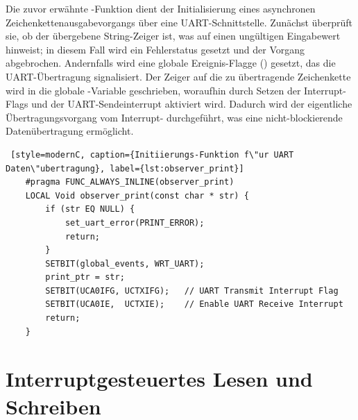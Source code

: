 \newpage
Die zuvor erw\"ahnte -Funktion dient der Initialisierung eines asynchronen Zeichenkettenausgabevorgangs \"uber eine UART-Schnittstelle. Zun\"achst \"uberpr\"uft sie, ob der \"ubergebene String-Zeiger  ist, was auf einen ung\"ultigen Eingabewert hinweist; in diesem Fall wird ein Fehlerstatus gesetzt und der Vorgang abgebrochen. Andernfalls wird eine globale Ereignis-Flagge () gesetzt, das die UART-\"Ubertragung signalisiert. Der Zeiger auf die zu \"ubertragende Zeichenkette wird in die globale -Variable geschrieben, woraufhin durch Setzen der Interrupt-Flags  und  der UART-Sendeinterrupt aktiviert wird. Dadurch wird der eigentliche \"Ubertragungsvorgang vom Interrupt- durchgef\"uhrt, was eine nicht-blockierende Daten\"ubertragung erm\"oglicht.

\vspace{0.5cm}
\begin{lstlisting} [style=modernC, caption={Initiierungs-Funktion f\"ur UART Daten\"ubertragung}, label={lst:observer_print}]
	#pragma FUNC_ALWAYS_INLINE(observer_print)
	LOCAL Void observer_print(const char * str) {
		if (str EQ NULL) {
			set_uart_error(PRINT_ERROR);
			return;
		}
		SETBIT(global_events, WRT_UART);
		print_ptr = str;
		SETBIT(UCA0IFG, UCTXIFG);   // UART Transmit Interrupt Flag
		SETBIT(UCA0IE,  UCTXIE);    // Enable UART Receive Interrupt
		return;
	}
\end{lstlisting}


\newpage
\section{Interruptgesteuertes Lesen und Schreiben}
\label{sec:Interruptgesteuertes_Lesen&Schreiben}

